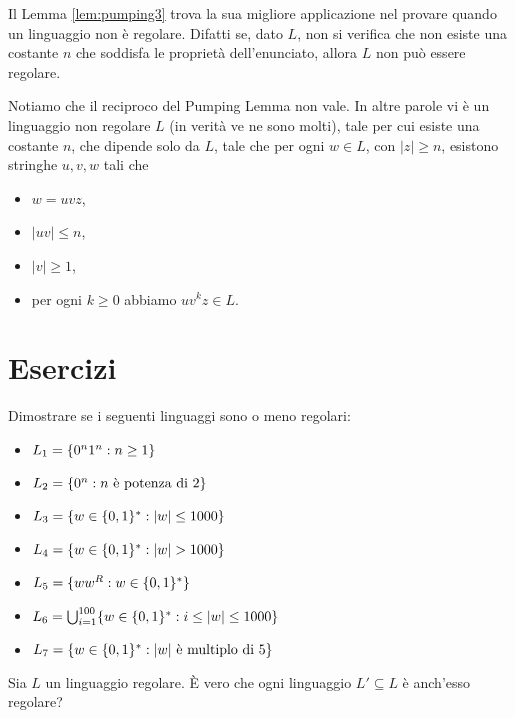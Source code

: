 \documentclass[runningheads,a4paper]{llncs}
\begin{document}
Il Lemma \ref{lem:pumping3} trova la sua migliore applicazione nel provare quando un linguaggio non \`{e} regolare. Difatti se, dato $L$, non si verifica che non esiste una costante $n$ che soddisfa le propriet\`{a} dell'enunciato, allora $L$ non pu\`{o} essere regolare.

\begin{remark}
Notiamo che il reciproco del Pumping Lemma non vale. In altre parole vi \`{e} un linguaggio non regolare $L$ (in verit\`{a} ve ne sono molti), tale per cui esiste una costante $n$, che dipende solo da $L$, tale che per ogni $w \in L$, con $|z| \geq n$, esistono stringhe $u,v,w$ tali che 
\begin{itemize}
  \item $w = uvz$,
  \item $|uv| \leq n$,
  \item $|v| \geq 1$,
  \item per ogni $k \geq 0$ abbiamo $uv^kz \in L$.
\end{itemize}
\end{remark}

\section{Esercizi}

\begin{example}
Dimostrare se i seguenti linguaggi sono o meno regolari:
\begin{itemize}
\item $L_1 = \{0^n1^n : n \geq 1\}$
\item $L_2 = \{0^n : n \mbox{ \`{e} potenza di } 2\}$
\item $L_3 = \{w \in \{0,1\}^* : |w| \leq 1000\}$
\item $L_4 = \{w \in \{0,1\}^* : |w| > 1000\}$
\item $L_5 = \{ww^R : w \in \{0,1\}^*\}$
\item $L_6 = \bigcup_{i=1}^{100} \{w \in \{0,1\}^* : i \leq |w| \leq 1000\}$
\item $L_7 = \{w \in \{0,1\}^* : |w| \mbox{ \`{e} multiplo di } 5 \}$
\end{itemize}
\end{example}

\begin{example}
Sia $L$ un linguaggio regolare. \`{E} vero che ogni linguaggio $L' \subseteq L$ \`{e} anch'esso regolare?
\end{example}

%
\end{document}
